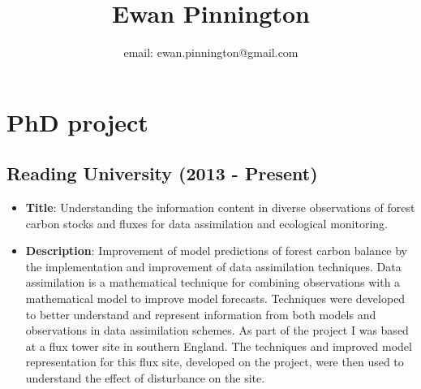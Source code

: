 \documentclass[11pt]{article}
\title{Ewan Pinnington}
\date{}
\author{email: ewan.pinnington@gmail.com}
\begin{document}
\maketitle

\section*{PhD project}
\subsection*{Reading University (2013 - Present) }
\begin{itemize}
\item \textbf{Title}: Understanding the information content in diverse observations of forest carbon stocks and fluxes for data assimilation and ecological monitoring.
\item \textbf{Description}: Improvement of model predictions of forest carbon balance by the implementation and improvement of data assimilation techniques. Data assimilation is a mathematical technique for combining observations with a mathematical model to improve model forecasts. Techniques were developed to better understand and represent information from both models and observations in data assimilation schemes. As part of the project I was based at a flux tower site in southern England. The techniques and improved model representation for this flux site, developed on the project, were then used to understand the effect of disturbance on the site. 
\end{itemize}
\end{document}
